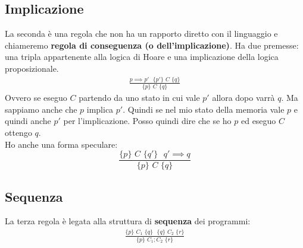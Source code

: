\subsection{Implicazione}
\begin{definizione}
	La seconda è una regola che non ha un rapporto diretto con il linguaggio e
	chiameremo \textbf{regola di conseguenza (o dell'implicazione)}. Ha due
	premesse: una tripla appartenente alla logica di Hoare e una implicazione della
	logica proposizionale.
	\begin{align}\label{ImplicationRule}
		\frac{p\implies p'\,\, \,\,\{p'\}\,\, C\,\,\{q\}}{\{p\}\,\, C\,\,\{q\}} 
	\end{align}
	Ovvero se eseguo $C$ partendo da uno stato in cui vale $p'$ allora dopo varrà
	$q$. Ma sappiamo anche che $p$ implica $p'$. Quindi se nel mio stato della
	memoria vale $p$ e quindi anche $p'$ per l'implicazione. Posso quindi dire che
	se ho $p$ ed eseguo $C$ ottengo $q$.\\
	Ho anche una forma speculare:
	\[\frac{\{p\}\,\, C\,\,\{q'\}\,\, \,\, q'\implies q}{\{p\}\,\, C\,\,\{q\}}\]
\end{definizione}
\subsection{Sequenza}
\begin{definizione}
	La terza regola è legata alla struttura di \textbf{sequenza} dei programmi:
	\begin{align}\label{SequenceRule}
		\frac{\{p\}\,\, C_1\,\,\{q\}\,\,                       
		\,\,\{q\}\,\, C_2\,\,\{r\}}{\{p\}\,\, C_1;C_2\,\,\{r\}} 
	\end{align}
		  
		
\end{definizione}
